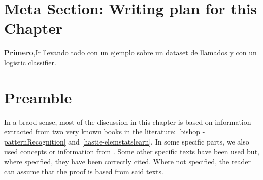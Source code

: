 \section{Meta Section: Writing plan for this Chapter}
\textbf{Primero},Ir llevando todo con un ejemplo sobre un dataset de llamados y con un logistic classifier.

\section{Preamble}\label{section-preamble}

In a braod sense, most of the discussion in this chapter is based on information extracted from two very known books in the literature: \ref{bishop - patternRecognition} and  \ref{hastie-elemstatslearn}. In some specific parts, we also used concepts or information from \label{scikit-learn} . Some other specific texts have been used but, where specified, they have been correctly cited.
Where not specified, the reader can assume that the proof is based from said texts.
